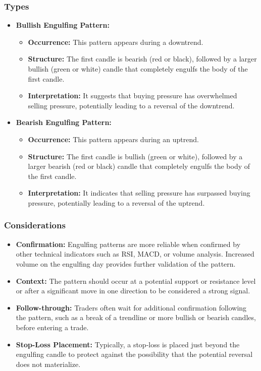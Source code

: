 \documentclass{report}
\begin{document}
    \subsubsection{Types}
    \begin{itemize}
        \item \textbf{Bullish Engulfing Pattern:}
            \begin{itemize}
                \item \textbf{Occurrence:} This pattern appears during a downtrend.
                \item \textbf{Structure:} The first candle is bearish (red or black), followed by a larger bullish (green or white) candle that completely engulfs the body of the first candle.
                \item \textbf{Interpretation:} It suggests that buying pressure has overwhelmed selling pressure, potentially leading to a reversal of the downtrend.
            \end{itemize}
        \item \textbf{Bearish Engulfing Pattern:}
            \begin{itemize}
                \item \textbf{Occurrence:} This pattern appears during an uptrend.
                \item \textbf{Structure:} The first candle is bullish (green or white), followed by a larger bearish (red or black) candle that completely engulfs the body of the first candle.
                \item \textbf{Interpretation:} It indicates that selling pressure has surpassed buying pressure, potentially leading to a reversal of the uptrend.
            \end{itemize}
    \end{itemize}

    \bigbreak \noindent 
    \subsubsection{Considerations}
    \bigbreak \noindent 
    \begin{itemize}
        \item \textbf{Confirmation:} Engulfing patterns are more reliable when confirmed by other technical indicators such as RSI, MACD, or volume analysis. Increased volume on the engulfing day provides further validation of the pattern.
        \item \textbf{Context:} The pattern should occur at a potential support or resistance level or after a significant move in one direction to be considered a strong signal.
        \item \textbf{Follow-through:} Traders often wait for additional confirmation following the pattern, such as a break of a trendline or more bullish or bearish candles, before entering a trade.
        \item \textbf{Stop-Loss Placement:} Typically, a stop-loss is placed just beyond the engulfing candle to protect against the possibility that the potential reversal does not materialize.
    \end{itemize}
\end{document}
